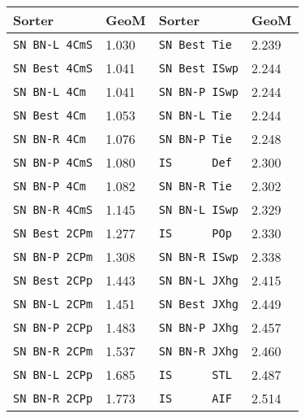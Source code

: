 \begin{tabular}{ l | l || l | l }
Sorter&GeoM&Sorter&GeoM\\ \hline
\verb+SN BN-L 4CmS+&1.030&\verb+SN Best Tie +&2.239\\
\verb+SN Best 4CmS+&1.041&\verb+SN Best ISwp+&2.244\\
\verb+SN BN-L 4Cm +&1.041&\verb+SN BN-P ISwp+&2.244\\
\verb+SN Best 4Cm +&1.053&\verb+SN BN-L Tie +&2.244\\
\verb+SN BN-R 4Cm +&1.076&\verb+SN BN-P Tie +&2.248\\
\verb+SN BN-P 4CmS+&1.080&\verb+IS      Def+&2.300\\
\verb+SN BN-P 4Cm +&1.082&\verb+SN BN-R Tie +&2.302\\
\verb+SN BN-R 4CmS+&1.145&\verb+SN BN-L ISwp+&2.329\\
\verb+SN Best 2CPm+&1.277&\verb+IS      POp+&2.330\\
\verb+SN BN-P 2CPm+&1.308&\verb+SN BN-R ISwp+&2.338\\
\verb+SN Best 2CPp+&1.443&\verb+SN BN-L JXhg+&2.415\\
\verb+SN BN-L 2CPm+&1.451&\verb+SN Best JXhg+&2.449\\
\verb+SN BN-P 2CPp+&1.483&\verb+SN BN-P JXhg+&2.457\\
\verb+SN BN-R 2CPm+&1.537&\verb+SN BN-R JXhg+&2.460\\
\verb+SN BN-L 2CPp+&1.685&\verb+IS      STL+&2.487\\
\verb+SN BN-R 2CPp+&1.773&\verb+IS      AIF+&2.514\\
\end{tabular}
